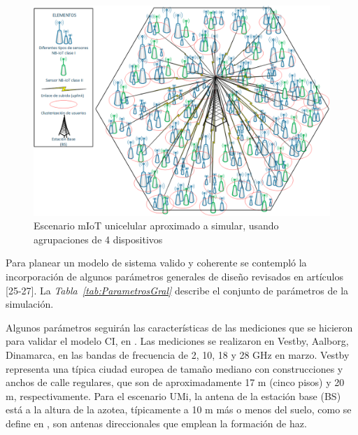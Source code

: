 \begin{figure}[th]
\centering
\includegraphics[scale=.7]{Figures/Escenario mIoT unicelda}
\decoRule
\caption[Escenario mIoT unicelular aproximado a simular, usando agrupaciones de 4 dispositivos]{Escenario mIoT unicelular aproximado a simular, usando agrupaciones de 4 dispositivos}
\label{fig:EscenarioMTC}
\end{figure}

Para planear un modelo de sistema valido y coherente se contempló la incorporación de algunos parámetros generales de diseño revisados en artículos [25-27]. La \textit{Tabla~\ref{tab:ParametrosGral}} describe el conjunto de parámetros de la simulación.

Algunos parámetros seguirán las características de las mediciones que se hicieron para validar el modelo CI, en \parencite{Sun2016}. Las mediciones se realizaron en Vestby, Aalborg, Dinamarca, en las bandas de frecuencia de 2, 10, 18 y 28 GHz en marzo. Vestby representa una típica ciudad europea de tamaño mediano con construcciones y anchos de calle regulares, que son de aproximadamente 17 m (cinco pisos) y 20 m, respectivamente. Para el escenario UMi, la antena de la estación base (BS) está a la altura de la azotea, típicamente a 10 m más o menos del suelo, como se define en \parencite{Sun2016}, son antenas direccionales que emplean la formación de haz.

